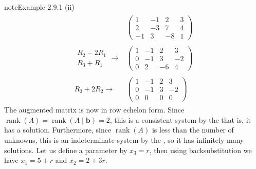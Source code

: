 \documentclass[letterpaper,10pt,english]{jupyterBook}
\begin{document}
\begin{sphinxadmonition}{note}{Example 2.9.1}
\sphinxAtStartPar
(ii)
\begin{equation*}
\begin{split} \begin{align*}
    & \left( \begin{array}{ccc|c}
        1 & -1 & 2 & 3 \\
        2 & -3 & 7 & 4 \\
        -1 & 3 & -8 & 1 
    \end{array} \right)
    \\ \\
    \begin{array}{l} R_2 - 2R_1 \\ R_3 + R_1 \end{array} \longrightarrow &
    \left( \begin{array}{ccc|c}
        1 & -1 & 2 & 3 \\
        0 & -1 & 3 & -2 \\
        0 & 2 & -6 & 4 
    \end{array} \right)
    \\ \\
     R_3 + 2R_2 \longrightarrow &
    \left( \begin{array}{ccc|c}
        1 & -1 & 2 & 3 \\
        0 & -1 & 3 & -2 \\
        0 & 0 & 0 & 0
    \end{array} \right)
\end{align*} \end{split}
\end{equation*}
\sphinxAtStartPar
The augmented matrix is now in row echelon form. Since \(\operatorname{rank}(A) = \operatorname{rank}(A \mid \mathbf{b}) = 2\), this is a consistent system by the {\hyperref[\detokenize{_pages/2.6_Consistent_systems:consistent-system-theorem}]{}} \sphinxhyphen{} that is, it has a solution. Furthermore, since \(\operatorname{rank}(A) \) is less than the number of unknowns, this is an indeterminate system by the {\hyperref[\detokenize{_pages/2.6_Consistent_systems:indeterminate-system-theorem}]{}}, so it has infinitely many solutions. Let us define a parameter by \(x_3 = r\), then using back\sphinxhyphen{}substitution we have \(x_1 = 5 + r\) and \(x_2 = 2 + 3r\).


\end{sphinxadmonition}
\end{document}
